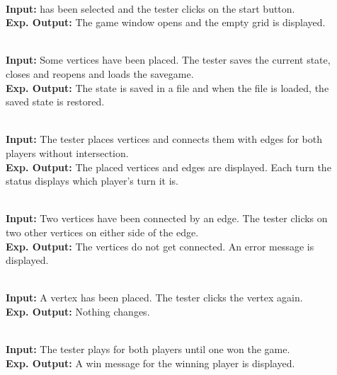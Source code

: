 \begin{description}
	
	\item[] \textbf{} \\
	\textbf{Input:} \twixt has been selected and the tester clicks on the start button. \\
	\textbf{Exp. Output:} The game window opens and the empty grid is displayed.
	
	\item[] \textbf{} \\
	\textbf{Input:} Some vertices have been placed. The tester saves the current state, closes and reopens \twixt and loads the savegame. \\
	\textbf{Exp. Output:} The state is saved in a file and when the file is loaded, the saved state is restored.
	
	\item[] \textbf{} \\
	\textbf{Input:} The tester places vertices and connects them with edges for both players without intersection. \\
	\textbf{Exp. Output:} The placed vertices and edges are displayed. Each turn the status displays which player's turn it is.
	
	\item[] \textbf{} \\
	\textbf{Input:} Two vertices have been connected by an edge. The tester clicks on two other vertices on either side of the edge. \\
	\textbf{Exp. Output:} The vertices do not get connected. An error message is displayed.
	
	\item[] \textbf{} \\
	\textbf{Input:} A vertex has been placed. The tester clicks the vertex again. \\
	\textbf{Exp. Output:} Nothing changes.
	
	\item[] \textbf{} \\
	\textbf{Input:} The tester plays for both players until one won the game. \\
	\textbf{Exp. Output:} A win message for the winning player is displayed.
	
\end{description}

